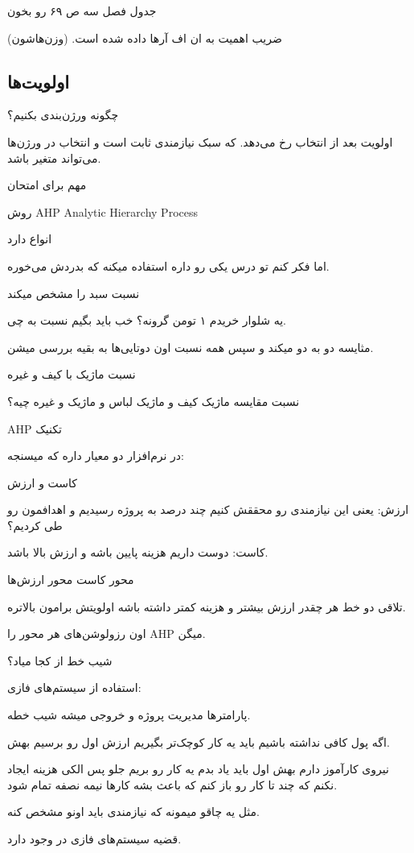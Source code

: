 جدول فصل سه ص ۶۹ رو بخون

ضریب اهمیت به ان اف آر‌ها داده شده است. (وزن‌هاشون)

\subsection{اولویت‌ها}

چگونه ورژن‌بندی بکنیم؟

اولویت بعد از انتخاب رخ می‌دهد.
که سبک نیازمندی ثابت است و انتخاب در ورژن‌ها می‌تواند متغیر باشد.

مهم برای امتحان

روش AHP Analytic Hierarchy Process

انواع دارد

اما فکر کنم تو درس یکی رو داره استفاده میکنه که بدردش می‌خوره.

نسبت سبد را مشخص میکند

یه شلوار خریدم ۱ تومن گرونه؟ خب باید بگیم نسبت به چی.

مثایسه دو به دو میکند و سپس همه نسبت اون دوتایی‌ها به بقیه بررسی میشن.

نسبت ماژیک با کیف و غیره

نسبت مقایسه ماژیک کیف و ماژیک لباس و ماژیک و غیره چیه؟

AHP تکنیک

در نرم‌افزار دو معیار داره که میسنجه:

کاست و ارزش

ارزش: یعنی این نیازمندی رو محققش کنیم چند درصد به پروژه رسیدیم و اهدافمون رو طی
کردیم؟

کاست: دوست داریم هزینه پایین باشه و ارزش بالا باشد.

محور کاست 
محور ارزش‌ها

تلاقی دو خط هر چقدر ارزش بیشتر و هزینه کمتر داشته باشه اولویتش برامون بالاتره.

اون رزولوشن‌های هر محور را AHP میگن.

شیب خط از کجا میاد؟

استفاده از سیستم‌های فازی:

پارامتر‌ها مدیریت پروژه و خروجی میشه شیب خطه.

اگه پول کافی نداشته باشیم باید یه کار کوچک‌تر بگیریم ارزش اول رو برسیم بهش.

نیروی کارآموز دارم بهش اول باید یاد بدم یه کار رو بریم جلو پس الکی هزینه ایجاد
نکنم که چند تا کار رو باز کنم که باعث بشه کار‌ها نیمه نصفه تمام شود.

مثل یه چاقو میمونه که نیازمندی باید اونو مشخص کنه.

قضیه سیستم‌های فازی در  وجود دارد.


